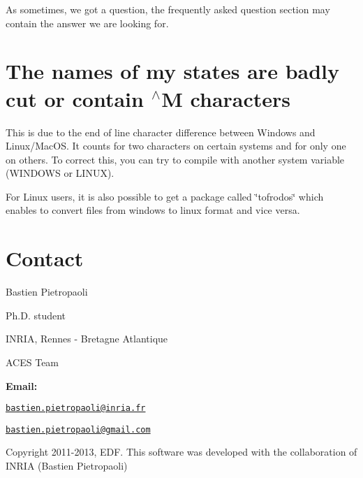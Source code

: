 As sometimes, we got a question, the frequently asked question section may contain the answer we are looking for.\hypertarget{_f_a_q_page_FAQ_character}{}\section{The names of my states are badly cut or contain $^\wedge$M characters}\label{_f_a_q_page_FAQ_character}
This is due to the end of line character difference between Windows and Linux/MacOS. It counts for two characters on certain systems and for only one on others. To correct this, you can try to compile with another system variable (WINDOWS or LINUX).

For Linux users, it is also possible to get a package called \char`\"{}tofrodos\char`\"{} which enables to convert files from windows to linux format and vice versa.\hypertarget{_f_a_q_page_FAQ_contact}{}\section{Contact}\label{_f_a_q_page_FAQ_contact}
Bastien Pietropaoli \par
 Ph.D. student \par
 INRIA, Rennes -\/ Bretagne Atlantique \par
 ACES Team \par


{\bfseries Email:} \par
 \href{mailto:bastien.pietropaoli@inria.fr}{\tt bastien.pietropaoli@inria.fr} \par
 \href{mailto:bastien.pietropaoli@gmail.com}{\tt bastien.pietropaoli@gmail.com} \par


Copyright 2011-\/2013, EDF. This software was developed with the collaboration of INRIA (Bastien Pietropaoli) 